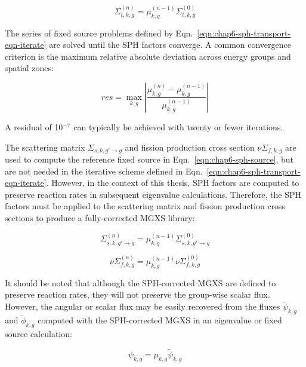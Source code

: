 \begin{dmath}
\label{eqn:chap6-sph-update-sigt}
\Sigma_{t,k,g}^{(n)} = \mu_{k,g}^{(n-1)}\Sigma_{t,k,g}^{(0)}
\end{dmath}

The series of fixed source problems defined by Eqn.~\ref{eqn:chap6-sph-transport-eqn-iterate} are solved until the SPH factors converge. A common convergence criterion is the maximum relative absolute deviation across energy groups and spatial zones:

\begin{dmath}
\label{eqn:chap6-sph-residual}
res = \max_{k,g} \left|\frac{\mu_{k,g}^{(n)} - \mu_{k,g}^{(n-1)}}{\mu_{k,g}^{(n-1)}}\right|
\end{dmath}

\noindent A residual of 10$^{-7}$ can typically be achieved with twenty or fewer iterations.

The scattering matrix $\Sigma_{s,k,g'\rightarrow g}$ and fission production cross section $\nu\Sigma_{f,k,g}$ are used to compute the reference fixed source in Eqn.~\ref{eqn:chap6-sph-source}, but are not needed in the iterative scheme defined in Eqn.~\ref{eqn:chap6-sph-transport-eqn-iterate}. However, in the context of this thesis, SPH factors are computed to preserve reaction rates in subsequent eigenvalue calculations. Therefore, the SPH factors must be applied to the scattering matrix and fission production cross sections to produce a fully-corrected MGXS library:

\begin{dmath}
\label{eqn:chap6-sph-update-sigs}
\Sigma_{s,k,g'\rightarrow g}^{(n)} = \mu_{k,g}^{(n-1)}\Sigma_{s,k,g'\rightarrow g}^{(0)}
\end{dmath}

\begin{dmath}
\label{eqn:chap6-sph-update-nusigf}
\nu\Sigma_{f,k,g}^{(n)} = \mu_{k,g}^{(n-1)}\nu\Sigma_{f,k,g}^{(0)}
\end{dmath}

It should be noted that although the SPH-corrected MGXS are defined to preserve reaction rates, they will not preserve the group-wise scalar flux. However, the angular or scalar flux may be easily recovered from the fluxes $\tilde{\psi}_{k,g}$ and $\tilde{\phi}_{k,g}$ computed with the SPH-corrected MGXS in an eigenvalue or fixed source calculation:

\begin{dmath}
\label{eqn:chap6-sph-update-angular-flux}
\psi_{k,g} = \mu_{k,g}\tilde{\psi}_{k,g}
\end{dmath}

